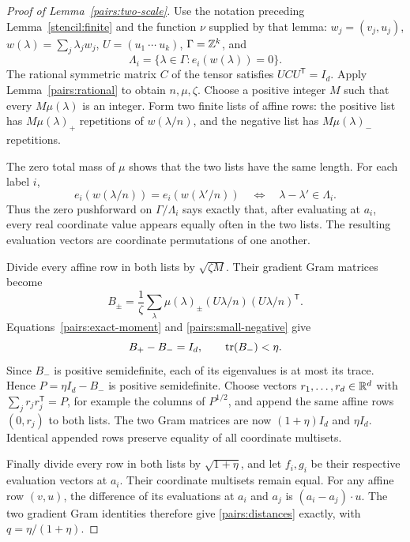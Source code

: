 \begin{proof}[Proof of Lemma~\ref{pairs:two-scale}]
Use the notation preceding Lemma~\ref{stencil:finite} and the function
$\nu$ supplied by that lemma:
$w_j=(v_j,u_j)$, $w(\lambda)=\sum_j\lambda_jw_j$,
$U=(u_1\ \cdots\ u_k)$, $\Gamma=\mathbb Z^k$, and
\[
 \Lambda_i=\{\lambda\in\Gamma:e_i(w(\lambda))=0\}.
\]
The rational symmetric matrix $C$ of the tensor satisfies
$UCU^{\mathsf T}=I_d$. Apply Lemma~\ref{pairs:rational} to obtain
$n,\mu,\zeta$. Choose a positive integer $M$ such that every
$M\mu(\lambda)$ is an integer. Form two finite lists of affine rows:
the positive list has $M\mu(\lambda)_+$ repetitions of $w(\lambda/n)$,
and the negative list has $M\mu(\lambda)_-$ repetitions.

The zero total mass of $\mu$ shows that the two lists have the same
length. For each label $i$,
\[
 e_i(w(\lambda/n))=e_i(w(\lambda'/n))
 \quad\Longleftrightarrow\quad \lambda-\lambda'\in\Lambda_i.
\]
Thus the zero pushforward on $\Gamma/\Lambda_i$ says exactly that,
after evaluating at $a_i$, every real coordinate value appears equally
often in the two lists. The resulting evaluation vectors are coordinate
permutations of one another.

Divide every affine row in both lists by $\sqrt{\zeta M}$. Their
gradient Gram matrices become
\[
 B_\pm=\frac1\zeta\sum_\lambda\mu(\lambda)_\pm
       (U\lambda/n)(U\lambda/n)^{\mathsf T}.
\]
Equations~\eqref{pairs:exact-moment} and
\eqref{pairs:small-negative} give
\[
 B_+-B_-=I_d,
 \qquad \operatorname{tr}(B_-)<\eta.
\]
Since $B_-$ is positive semidefinite, each of its eigenvalues is at most
its trace. Hence $P=\eta I_d-B_-$ is positive semidefinite. Choose
vectors $r_1,\ldots,r_d\in\mathbb R^d$ with
$\sum_jr_jr_j^{\mathsf T}=P$, for example the columns of $P^{1/2}$,
and append the same affine rows $(0,r_j)$ to both lists. The two Gram
matrices are now $(1+\eta)I_d$ and $\eta I_d$. Identical appended rows
preserve equality of all coordinate multisets.

Finally divide every row in both lists by $\sqrt{1+\eta}$, and let
$f_i,g_i$ be their respective evaluation vectors at $a_i$. Their
coordinate multisets remain equal. For any affine row $(v,u)$, the
difference of its evaluations at $a_i$ and $a_j$ is
$(a_i-a_j)\cdot u$. The two gradient Gram identities therefore give
\eqref{pairs:distances} exactly, with $q=\eta/(1+\eta)$.
\end{proof}
